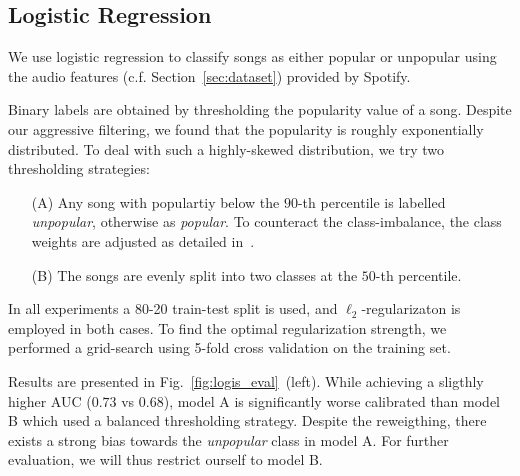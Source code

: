 \documentclass{article}
\begin{document}
\subsection{Logistic Regression}
We use logistic regression to classify songs as either popular or unpopular using the audio features (c.f. Section~\ref{sec:dataset}) provided by Spotify. 

Binary labels are obtained by thresholding the popularity value of a song. Despite our aggressive filtering, we found that the popularity is roughly exponentially distributed. To deal with such a highly-skewed distribution, we try two thresholding strategies:
\begin{enumerate}
  \item[(A)] Any song with populartiy below the $90$-th percentile is labelled \emph{unpopular}, otherwise as \emph{popular}. To counteract the class-imbalance, the class weights are adjusted as detailed in~\cite{haixiangLearningClassimbalancedData2017a}.
  \item[(B)] The songs are evenly split into two classes at the $50$-th percentile.
\end{enumerate}

In all experiments a 80-20 train-test split is used, and $\ell_2$-regularizaton is employed in both cases. To find the optimal regularization strength, we performed a grid-search using 5-fold cross validation on the training set.

Results are presented in Fig.~\ref{fig:logis_eval}~(left). While achieving a sligthly higher AUC ($0.73$ vs $0.68$), model A is significantly worse calibrated than model B which used a balanced thresholding strategy. Despite the reweigthing, there exists a strong bias towards the \emph{unpopular} class in model A. For further evaluation, we will thus restrict ourself to model B.


\end{document}
